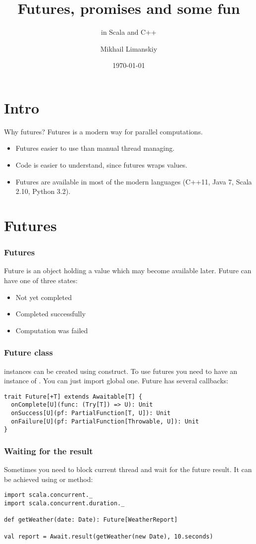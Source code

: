 \documentclass[t]{beamer}
\title{Futures, promises and some fun}
\subtitle{in Scala and C++}
\author{Mikhail Limanskiy}
\institute{SymphonyTeleca}
\date{\today}
\begin{document}
\begin{frame}
    \titlepage
\end{frame}

\section {Intro}

\begin{frame}{Why futures?}
Futures is a modern way for parallel computations.
\begin{itemize}
\item Futures easier to use than manual thread managing.
\item Code is easier to understand, since futures wraps values.
\item Futures are available in most of the modern languages (C++11, Java 7, Scala 2.10, Python 3.2).
\end{itemize}
\end{frame}

\section{Futures}

\begin{frame}
\frametitle{Futures}
Future is an object holding a value which may become available later.  Future can have one of three states:
\begin{itemize}
\item Not yet completed
\item Completed successfully
\item Computation was failed
\end{itemize}
\end{frame}

\begin{frame}[fragile]
\frametitle{Future class}
 instances can be created using  construct.
To use futures you need to have an instance of . You can just import global one.
Future has several callbacks:
\begin{lstlisting}
trait Future[+T] extends Awaitable[T] {
  onComplete[U](func: (Try[T]) => U): Unit
  onSuccess[U](pf: PartialFunction[T, U]): Unit
  onFailure[U](pf: PartialFunction[Throwable, U]): Unit
}
\end{lstlisting}
\end{frame}

\begin{frame}[fragile]
\frametitle{Waiting for the result}
Sometimes you need to block current thread and wait for the future result.
It can be achieved using  or  method:
\begin{example}
\begin{lstlisting}
import scala.concurrent._
import scala.concurrent.duration._

def getWeather(date: Date): Future[WeatherReport]

val report = Await.result(getWeather(new Date), 10.seconds)
\end{lstlisting}
\end{example}
\end{frame}
\end{document}

